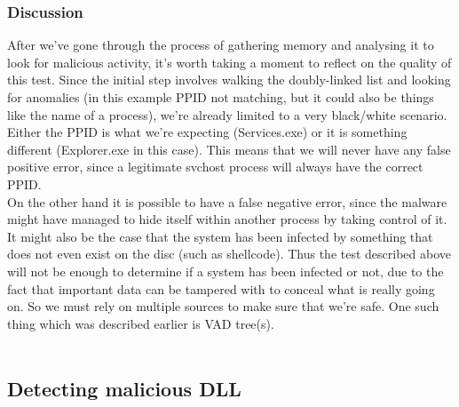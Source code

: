 \documentclass[a4paper]{article}
\begin{document}
\subsubsection{Discussion}
After we've gone through the process of gathering memory and analysing it to look for malicious
activity, it's worth taking a moment to reflect on the quality of this test. Since the initial
step involves walking the doubly-linked list and looking for anomalies (in this example PPID not
matching, but it could also be things like the name of a process), we're already limited to a very
black/white scenario. Either the PPID is what we're expecting (Services.exe) or it is something
different (Explorer.exe in this case). This means that we will never have any false positive error,
since a legitimate svchost process will always have the correct PPID. \\
On the other hand it is possible to have a false negative error, since the malware might have managed
to hide itself within another process by taking control of it. \\
It might also be the case that the system has been infected by something that does not even exist
on the disc (such as shellcode). Thus the test described above will not be enough to determine if
a system has been infected or not, due to the fact that important data can be tampered with to
conceal what is really going on. So we must rely on multiple sources to make sure that we're safe.
One such thing which was described earlier is VAD tree(s). \\\\

\newpage
\subsection{Detecting malicious DLL}
\end{document}
